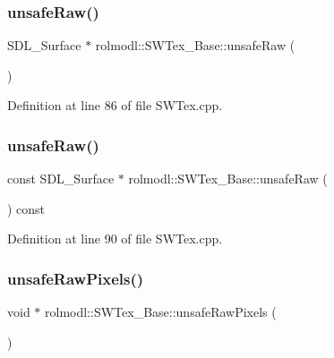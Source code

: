 \subsubsection{\texorpdfstring{unsafeRaw()}{unsafeRaw()}\hspace{0.1cm}{\footnotesize\ttfamily [1/2]}}
{\footnotesize\ttfamily S\+D\+L\+\_\+\+Surface $\ast$ rolmodl\+::\+S\+W\+Tex\+\_\+\+Base\+::unsafe\+Raw (\begin{DoxyParamCaption}{ }\end{DoxyParamCaption})\hspace{0.3cm}{\ttfamily [noexcept]}}



Definition at line 86 of file S\+W\+Tex.\+cpp.

\mbox{\label{classrolmodl_1_1_s_w_tex___base_a7c98bfe29be0c8cd4160ca88db8da00a}} 
\subsubsection{\texorpdfstring{unsafeRaw()}{unsafeRaw()}\hspace{0.1cm}{\footnotesize\ttfamily [2/2]}}
{\footnotesize\ttfamily const S\+D\+L\+\_\+\+Surface $\ast$ rolmodl\+::\+S\+W\+Tex\+\_\+\+Base\+::unsafe\+Raw (\begin{DoxyParamCaption}{ }\end{DoxyParamCaption}) const\hspace{0.3cm}{\ttfamily [noexcept]}}



Definition at line 90 of file S\+W\+Tex.\+cpp.

\mbox{\label{classrolmodl_1_1_s_w_tex___base_ab4e29b063221ee6f8e5fa53e4f073a36}} 
\subsubsection{\texorpdfstring{unsafeRawPixels()}{unsafeRawPixels()}\hspace{0.1cm}{\footnotesize\ttfamily [1/2]}}
{\footnotesize\ttfamily void $\ast$ rolmodl\+::\+S\+W\+Tex\+\_\+\+Base\+::unsafe\+Raw\+Pixels (\begin{DoxyParamCaption}{ }\end{DoxyParamCaption})\hspace{0.3cm}{\ttfamily [noexcept]}}



